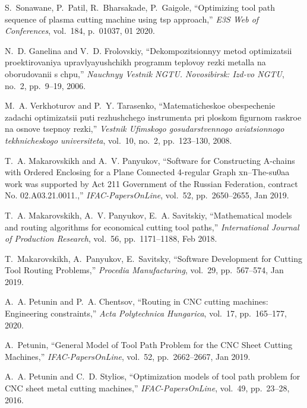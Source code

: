   \item
  S.~Sonawane, P.~Patil, R.~Bharsakade, P.~Gaigole, ``Optimizing tool path
    sequence of plasma cutting machine using tsp approach,'' {\em E3S Web of
    Conferences}, vol.~184, p.~01037, 01 2020.

  \item
  N.~D. Ganelina and V.~D. Frolovskiy, ``Dekompozitsionnyy metod optimizatsii
    proektirovaniya upravlyayushchikh programm teplovoy rezki metalla na
    oborudovanii s chpu,'' {\em Nauchnyy Vestnik NGTU. Novosibirsk: Izd-vo NGTU},
    no.~2, pp.~9--19, 2006.

  \item
  M.~A. Verkhoturov and P.~Y. Tarasenko, ``Matematicheskoe obespechenie zadachi
    optimizatsii puti rezhushchego instrumenta pri ploskom figurnom raskroe na
    osnove tsepnoy rezki,'' {\em Vestnik Ufimskogo gosudarstvennogo aviatsionnogo
    tekhnicheskogo universiteta}, vol.~10, no.~2, pp.~123--130, 2008.

  \item
  T.~A. Makarovskikh and A.~V. Panyukov, ``{Software for Constructing A-chains
    with Ordered Enclosing for a Plane Connected 4-regular Graph xn--The-su0aa
    work was supported by Act 211 Government of the Russian Federation, contract
    No. 02.A03.21.0011.},'' {\em IFAC-PapersOnLine}, vol.~52, pp.~2650--2655, Jan
    2019.

  \item
  T.~A. Makarovskikh, A.~V. Panyukov, E.~A. Savitskiy, ``{Mathematical models
    and routing algorithms for economical cutting tool paths},'' {\em
    International Journal of Production Research}, vol.~56, pp.~1171--1188, Feb
    2018.

  \item
  T.~Makarovskikh, A.~Panyukov, E.~Savitsky, ``{Software Development for
    Cutting Tool Routing Problems},'' {\em Procedia Manufacturing}, vol.~29,
    pp.~567--574, Jan 2019.

  \item
  A.~A. Petunin and P.~A. Chentsov, ``Routing in {CNC} cutting machines:
    Engineering constraints,'' {\em Acta Polytechnica Hungarica}, vol.~17,
    pp.~165--177, 2020.

  \item
  A.~Petunin, ``{General Model of Tool Path Problem for the {CNC} Sheet Cutting
    Machines},'' {\em IFAC-PapersOnLine}, vol.~52, pp.~2662--2667, Jan 2019.

  \item
  A.~A. Petunin and C.~D. Stylios, ``Optimization models of tool path problem for
    {CNC} sheet metal cutting machines,'' {\em IFAC-PapersOnLine}, vol.~49,
    pp.~23--28, 2016.

